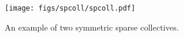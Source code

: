 \begin{figure}[bp]
    \centering
    \texttt{[image: figs/spcoll/spcoll.pdf]}

    \caption{
        An example of two symmetric sparse collectives.
    }

    \label{fig:spcoll}
\end{figure}
